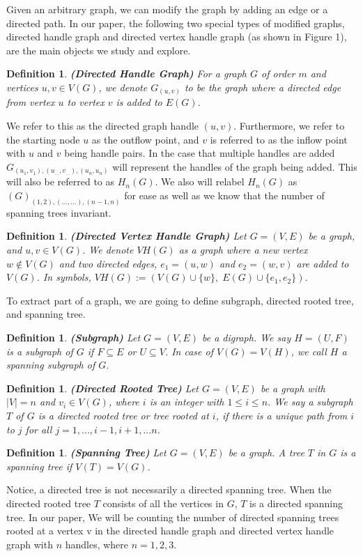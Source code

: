 \documentclass[twoside,11pt]{article}
\newtheorem{definition}[theorem]{Definition}
\numberwithin{equation}{section} \DeclareMathOperator{\Var}{Var}
\newcommand{\bdf}{\begin{definition}}
\newcommand{\edf}{\end{definition}}
\begin{document}
Given an arbitrary graph, we can modify the graph by adding an edge or a directed path. In our paper, the following two special types of  modified graphs, directed handle graph and directed vertex handle graph (as shown in Figure 1), are the main objects we study and explore.

\bdf {\bf{(Directed Handle Graph)}}
For a graph $G$ of order $m$ and vertices $u,v\in V(G)$, we denote $G_{(u,v)}$ to be the graph where a directed edge from vertex $u$ to vertex $v$ is added to $E(G)$.
\edf

 We refer to this as the directed graph handle $(u,v)$. Furthermore, we refer to the starting node $u$ as the outflow point, and $v$ is referred to as the inflow point with $u$ and $v$ being handle pairs. In the case that multiple handles are added $G_{(u_{1},v_{1}),(u_{...},v_{...}),(u_{n},u_{n})}$ will represent the handles of the graph being added. This will also be referred to as $H_{n}(G)$. We also will relabel $H_{n}(G)$ as 
 $(G)_{(1,2),(...,...),(n-1,n)}$ for ease as well as we know that the number of spanning trees invariant.

\bdf {\bf{(Directed Vertex Handle Graph)}}
Let $G=(V,E)$ be a graph, and $u,v\in V(G)$. We denote $VH(G)$ as a graph where a new vertex $w\notin V(G)$ and two directed edges, $e_1=(u,w)$ and $e_2=(w,v)$ are added to $V(G)$. In symbols, $VH(G):= (V(G)\cup \{w\},\; E(G)\cup \{e_1,e_2\})$.
\edf

To extract part of a graph, we are going to define subgraph, directed rooted tree, and spanning tree.
\bdf
{\bf (Subgraph)}
Let $G= (V,E)$ be a digraph.  We say $H= (U,F)$ is a subgraph of $G$ if $F \subseteq E$ or \(U \subseteq V\).  In case of $V(G)=V(H)$, we call $H$ a spanning subgraph of $G$.
\edf

\bdf
{\bf (Directed  Rooted Tree)}
Let $G=(V,E)$ be a graph with $|V|=n$ and $v_i \in V(G)$, where $i$ is an integer with $1\leq i \leq n$.
We say a subgraph $T$ of $G$ is a directed  rooted tree or tree rooted at $i$, if there is a unique path from $i$ to $j$ for all $j=1,...,i-1,i+1,...n$.
\edf

\bdf
{\bf (Spanning Tree)}
Let $G=(V,E)$ be a graph. A tree $T$ in $G$ is a spanning tree if $V(T)= V(G)$. 
\edf


Notice, a directed tree is not necessarily a directed spanning tree. When the directed rooted tree $T$ consists of all the vertices in $G$, $T$ is a  directed spanning tree. In our paper,
We will be counting the number of directed spanning trees rooted at a vertex v in the directed handle graph and directed vertex handle graph with $n$ handles, where $n=1,2,3$.
\end{document}
